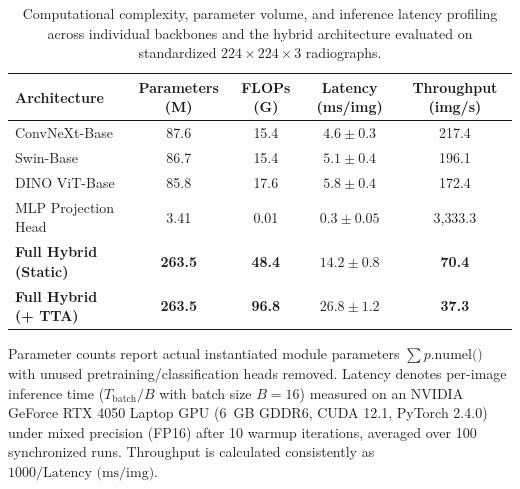\documentclass[10pt,journal]{IEEEtran}
\begin{document}
\begin{table}[t]
\centering
\caption{Computational complexity, parameter volume, and inference latency profiling across individual backbones and the hybrid architecture evaluated on standardized $224 \times 224 \times 3$ radiographs.}
\label{tab:computational_complexity}
\scriptsize
\setlength{\tabcolsep}{3pt}
\renewcommand{\arraystretch}{1.1}
\begin{tabularx}{\columnwidth}{@{}Xcccc@{}}
\toprule
\textbf{Architecture} & \textbf{Parameters (M)} & \textbf{FLOPs (G)} & \textbf{Latency (ms/img)} & \textbf{Throughput (img/s)} \\
\midrule
ConvNeXt-Base & 87.6 & 15.4 & $4.6 \pm 0.3$ & 217.4 \\
Swin-Base & 86.7 & 15.4 & $5.1 \pm 0.4$ & 196.1 \\
DINO ViT-Base & 85.8 & 17.6 & $5.8 \pm 0.4$ & 172.4 \\
MLP Projection Head & 3.41 & 0.01 & $0.3 \pm 0.05$ & 3{,}333.3 \\
\midrule
\textbf{Full Hybrid (Static)} & \textbf{263.5} & \textbf{48.4} & $\mathbf{14.2 \pm 0.8}$ & \textbf{70.4} \\
\textbf{Full Hybrid (+ TTA)} & \textbf{263.5} & \textbf{96.8} & $\mathbf{26.8 \pm 1.2}$ & \textbf{37.3} \\
\bottomrule
\end{tabularx}
\vspace{2pt}
\parbox{\columnwidth}{\footnotesize Parameter counts report actual instantiated module parameters $\sum p.\text{numel()}$ with unused pretraining/classification heads removed. Latency denotes per-image inference time ($T_{\text{batch}} / B$ with batch size $B = 16$) measured on an NVIDIA GeForce RTX 4050 Laptop GPU (6~GB GDDR6, CUDA 12.1, PyTorch 2.4.0) under mixed precision (FP16) after 10 warmup iterations, averaged over 100 synchronized runs. Throughput is calculated consistently as $1000 / \text{Latency (ms/img)}$.}
\end{table}
\end{document}

